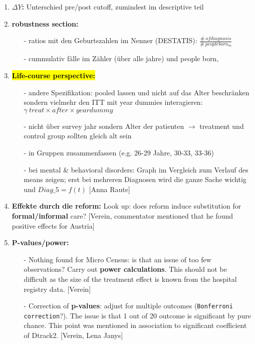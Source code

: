 \documentclass[11pt,a4paper]{article}
\begin{document}
{\begin{enumerate}
\item \textbf{$\Delta Y$:}\newline
Unterschied pre/post cutoff, zumindest im descriptive teil


\item \textbf{robustness section:}\vspace{-1em}
\begin{itemize}
\item[-] ratios mit den Geburtszahlen im Nenner (DESTATIS): $\frac{\#\ of diagnosis}{\#\ people born_m}$
\item[-] cummulativ fälle im Zähler (über alle jahre) und people born, 
\end{itemize}


\item \textbf{\hl{Life-course perspective:}}\vspace{-1em}
\begin{itemize}
\item[-]andere Spezifikation: pooled lassen und nicht auf das Alter beschränken sondern vielmehr den ITT mit year dummies interagieren: \newline
$\gamma\  treat \times after \times yeardummy$
\item[-] nicht über survey jahr sondern Alter der patienten $\rightarrow$ treatment und control group sollten gleich alt sein
\item[-] in Gruppen zusammenfassen (e.g. 26-29 Jahre, 30-33, 33-36)
\item[-] bei mental \& behavioral disorders: Graph im Vergleich zum Verlauf des means zeigen; erst bei mehreren Diagnosen wird die ganze Sache wichtig und $Diag\_5 = f(t)$ [Anna Raute]
\end{itemize}


\item \textbf{Effekte durch die reform:}\newline
Look up: does reform induce substitution for \textbf{formal/informal} care? [Verein, commentator mentioned that he found positive effects for Austria] 


\item \textbf{P-values/power:}\vspace{-1em}
\begin{itemize}
\item[-] Nothing found for Micro Census: is that an issue of too few observations? Carry out \textbf{power calculations}. This should not be difficult as the size of the treatment effect is known from the hospital registry data. [Verein]
\item[-] Correction of \textbf{p-values}: adjust for multiple outcomes (\texttt{Bonferroni correction}?). The issue is that 1 out of 20 outcome is significant by pure chance. This point was mentioned in association to significant coefficient of Dtrack2. [Verein, Lena Janys]
\end{itemize}



\end{enumerate}}
\end{document}
